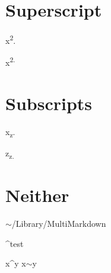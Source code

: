 
\def\mytitle{MultiMarkdown Superscript Test}
\def\latexmode{memoir}


\chapter{Superscript}
\label{superscript}

x\textsuperscript{2}.

x\textsuperscript{2.}

\chapter{Subscripts}
\label{subscripts}

x\textsubscript{z}.

z\textsubscript{z.}

\chapter{Neither}
\label{neither}

\ensuremath{\sim}\slash Library\slash MultiMarkdown

\^{}test

x\^{}y
x\ensuremath{\sim}y





